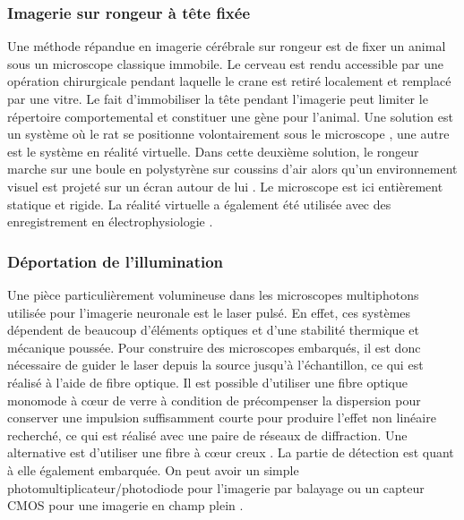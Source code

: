 \subsubsection{Imagerie sur rongeur à tête fixée}

Une méthode répandue en imagerie cérébrale sur rongeur est de fixer un animal sous un microscope classique immobile. Le cerveau est rendu accessible par une opération chirurgicale pendant laquelle le crane est retiré localement et remplacé par une vitre. Le fait d'immobiliser la tête pendant l'imagerie peut limiter le répertoire comportemental et constituer une gène pour l'animal. Une solution est un système où le rat se positionne volontairement sous le microscope \cite{scott_cellular_2013}, une autre est le système en réalité virtuelle. Dans cette deuxième solution, le rongeur marche sur une boule en polystyrène sur coussins d'air alors qu'un environnement visuel est projeté sur un écran autour de lui \cite{dombeck_functional_2010}. Le microscope est ici entièrement statique et rigide. La réalité virtuelle a également été utilisée avec des enregistrement en électrophysiologie \cite{aronov_engagement_2014}\cite{whitlock_navigating_2014}.



\subsubsection{Déportation de l'illumination}

Une pièce particulièrement volumineuse dans les microscopes multiphotons utilisée pour l'imagerie neuronale est le laser pulsé. En effet, ces systèmes dépendent de beaucoup d'éléments optiques et d'une stabilité thermique et mécanique poussée. Pour construire des microscopes embarqués, il est donc nécessaire de guider le laser depuis la source jusqu'à l'échantillon, ce qui est réalisé à l'aide de fibre optique. Il est possible d'utiliser une fibre optique monomode à cœur de verre \cite{helmchen_miniature_2001} \cite{sawinski_visually_2009} \cite{zong_fast_2017} à condition de précompenser la dispersion pour conserver une impulsion suffisamment courte pour produire l'effet non linéaire recherché, ce qui est réalisé avec une paire de réseaux de diffraction. Une alternative est d'utiliser une fibre à cœur creux \cite{tai_two-photon_2004} \cite{choi_improving_2014} \cite{piyawattanametha_vivo_2009} \cite{klioutchnikov_three-photon_2020}.
La partie de détection est quant à elle également embarquée. On peut avoir un simple photomultiplicateur/photodiode pour l'imagerie par balayage \cite{helmchen_miniature_2001} ou un capteur CMOS pour une imagerie en champ plein \cite{scott_imaging_2018}.

